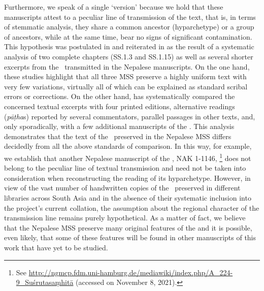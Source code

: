 Furthermore, we speak of a single `version' because we hold that these manuscripts attest to a peculiar line of transmission of the text, that is, in terms of stemmatic analysis, they share
a common ancestor (hyparchetype) or a group of ancestors, while at the same time, bear no signs of significant contamination. This hypothesis was postulated in \citet{kleb-2010} and reiterated in \citet{kleb-2021a} as the result of a systematic analysis of two complete chapters (SS.1.3 and SS.1.15)
as well as several shorter excerpts from the \SS\ transmitted in the Nepalese manuscripts. 
On the one hand, these studies highlight that all three MSS preserve a highly uniform text with very few variations, virtually all of which can be explained as standard scribal errors or corrections. 
On the other hand, \citet{kleb-2010,kleb-2021a} has systematically compared
the concerned textual excerpts with four printed editions, alternative readings (\emph{pāṭha}s) reported by several commentators,
parallel passages in other texts, and, only sporadically, with a few additional manuscripts of the \SS. This analysis demonstrates that the text of the \SS\ preserved in the Nepalese MSS differs decidedly from all the above standards of comparison. In this way, for example, we establish that another Nepalese manuscript of the \SS, NAK 1-1146,%
    \footnote{%
    See 
    \url{http://ngmcp.fdm.uni-hamburg.de/mediawiki/index.php/A_224-9_Suśrutasaṃhitā}
     (accessed on November 8, 2021).%
    } 
does not belong to the peculiar line of textual transmission and need not be taken into consideration when reconstructing the reading of its hyparchetype. 
However,  in view of the vast number of handwritten copies of the \SS\ preserved in different libraries across South Asia and in the absence of their systematic inclusion into the project's current collation,
the assumption about the regional character of the transmission line remains purely hypothetical. As a matter of fact, we believe that the Nepalese MSS preserve many original features of the \SS and it is possible, even likely, that some of these features will be found in other manuscripts of this work that have yet to be studied.%

